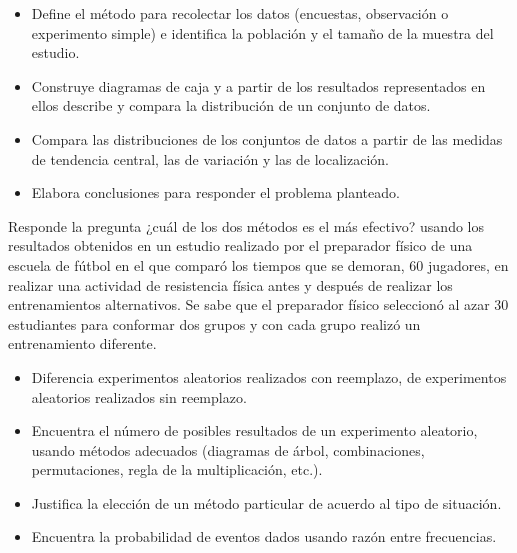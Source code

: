 \evidencias

\begin{itemize}
  \item Define el método para recolectar los datos (encuestas, observación o experimento simple) e identifica la población y el tamaño de la muestra del estudio.
  \item Construye diagramas de caja y a partir de los resultados representados en ellos describe y compara la distribución de un conjunto de datos.
  \item Compara las distribuciones de los conjuntos de datos a partir de las medidas de tendencia central, las de variación y las de localización.
  \item Elabora conclusiones para responder el problema planteado.
\end{itemize}

\ejemplo

Responde la pregunta ¿cuál de los dos métodos es el más efectivo? usando los resultados obtenidos en un estudio realizado por el preparador físico de una escuela de fútbol en el que comparó los tiempos que se demoran, 60 jugadores, en realizar una actividad de resistencia física antes y después de realizar los entrenamientos alternativos. Se sabe que el preparador físico seleccionó al azar 30 estudiantes para conformar dos grupos y con cada grupo realizó un entrenamiento diferente.




\evidencias

\begin{itemize}
  \item Diferencia experimentos aleatorios realizados con reemplazo, de experimentos aleatorios realizados sin reemplazo.
  \item Encuentra el número de posibles resultados de un experimento aleatorio, usando métodos adecuados (diagramas de árbol, combinaciones, permutaciones, regla de la multiplicación, etc.).
  \item Justifica la elección de un método particular de acuerdo al tipo de situación.
  \item Encuentra la probabilidad de eventos dados usando razón entre frecuencias.
\end{itemize}

